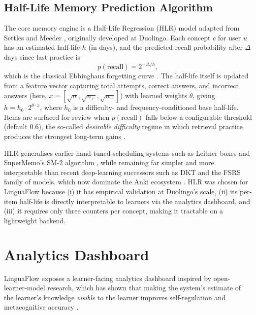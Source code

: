 \documentclass[11pt,a4paper]{article}
\begin{document}
\subsection{Half-Life Memory Prediction Algorithm}
The core memory engine is a Half-Life Regression (HLR) model adapted from Settles and Meeder \cite{settles2016trainable}, originally developed at Duolingo. Each concept $c$ for user $u$ has an estimated half-life $h$ (in days), and the predicted recall probability after $\Delta$ days since last practice is
\begin{equation}
  p(\text{recall}) = 2^{-\Delta / h},
\end{equation}
which is the classical Ebbinghaus forgetting curve \cite{ebbinghaus1885memory,murre2015replication}. The half-life itself is updated from a feature vector capturing total attempts, correct answers, and incorrect answers (here, $x = [\sqrt{n}, \sqrt{n_+}, \sqrt{n_-}]$) with learned weights $\theta$, giving $h = h_0 \cdot 2^{\theta \cdot x}$, where $h_0$ is a difficulty- and frequency-conditioned base half-life. Items are surfaced for review when $p(\text{recall})$ falls below a configurable threshold (default 0.6), the so-called \emph{desirable difficulty} regime in which retrieval practice produces the strongest long-term gains \cite{bjork1994memory,karpicke2008critical}.

HLR generalises earlier hand-tuned scheduling systems such as Leitner boxes \cite{leitner1972lernen} and SuperMemo's SM-2 algorithm \cite{wozniak1990optimization}, while remaining far simpler and more interpretable than recent deep-learning successors such as DKT \cite{piech2015deep} and the FSRS family of models, which now dominate the Anki ecosystem \cite{su2023fsrs}. HLR was chosen for LinguaFlow because (i) it has empirical validation at Duolingo's scale, (ii) its per-item half-life is directly interpretable to learners via the analytics dashboard, and (iii) it requires only three counters per concept, making it tractable on a lightweight backend.

\section{Analytics Dashboard}
LinguaFlow exposes a learner-facing analytics dashboard inspired by open-learner-model research, which has shown that making the system's estimate of the learner's knowledge \emph{visible} to the learner improves self-regulation and metacognitive accuracy \cite{bull2010open,bodily2018review}.
\end{document}
